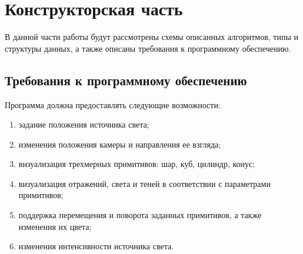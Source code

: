 
\chapter{Конструкторская часть}
В данной части работы будут рассмотрены схемы описанных алгоритмов, типы и структуры данных, а также описаны требования к программному обеспечению.

\section{Требования к программному обеспечению}
Программа должна предоставлять следующие возможности:
\begin{enumerate}
	\item задание положения источника света;
	\item изменения положения камеры и направления ее взгляда;
	\item визуализация трехмерных примитивов: шар, куб, цилиндр, конус;
	\item визуализация отражений, света и теней в соответствии с параметрами примитивов;
	\item поддержка перемещения и поворота заданных примитивов, а также изменения их цвета;
	\item изменения интенсивности источника света.
\end{enumerate}

